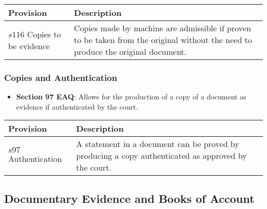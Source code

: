 \begin{longtable}[]{@{}
  >{\raggedright\arraybackslash}p{}
  >{\raggedright\arraybackslash}p{}@{}}
\toprule\noalign{}
\begin{minipage}[b]{\linewidth}\raggedright
Provision
\end{minipage} & \begin{minipage}[b]{\linewidth}\raggedright
Description
\end{minipage} \\
\midrule\noalign{}
\endhead
\bottomrule\noalign{}
\endlastfoot
\(s116\) Copies to be evidence & Copies made by machine are admissible
if proven to be taken from the original without the need to produce the
original document. \\
\end{longtable}

\subsubsection{Copies and
Authentication}\label{copies-and-authentication}

\begin{itemize}
\tightlist
\item
  \textbf{Section 97 EAQ}: Allows for the production of a copy of a
  document as evidence if authenticated by the court.
\end{itemize}

\begin{longtable}[]{@{}
  >{\raggedright\arraybackslash}p{}
  >{\raggedright\arraybackslash}p{}@{}}
\toprule\noalign{}
\begin{minipage}[b]{\linewidth}\raggedright
Provision
\end{minipage} & \begin{minipage}[b]{\linewidth}\raggedright
Description
\end{minipage} \\
\midrule\noalign{}
\endhead
\bottomrule\noalign{}
\endlastfoot
\(s97\) Authentication & A statement in a document can be proved by
producing a copy authenticated as approved by the court. \\
\end{longtable}

\subsection{  Documentary Evidence and Books of
Account}\label{documentary-evidence-and-books-of-account}

